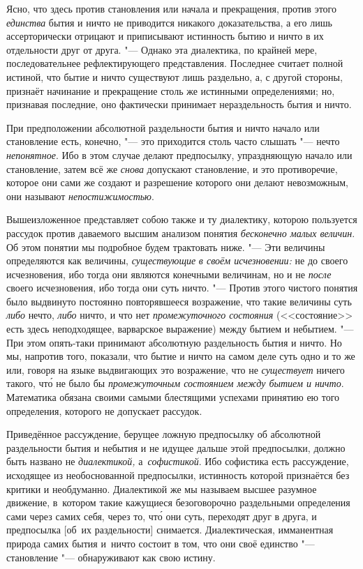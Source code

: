 Ясно, что здесь против становления или начала и прекращения, против этого {\em
единства} бытия и ничто не приводится никакого доказательства, а его лишь
ассерторически отрицают и приписывают истинность бытию и ничто в их отдельности
друг от друга. "--- Однако эта диалектика, по крайней мере, последовательнее
рефлектирующего представления. Последнее считает полной истиной, что бытие и
ничто существуют лишь раздельно, а, с другой стороны, признаёт начинание и
прекращение столь же истинными определениями; но, признавая последние, оно
фактически принимает нераздельность бытия и ничто.

При предположении абсолютной раздельности бытия и ничто начало или становление
есть, конечно, "--- это приходится столь часто слышать "--- нечто
{\em непонятное}. Ибо в этом случае делают предпосылку, упраздняющую начало
или становление, затем всё же {\em снова} допускают становление, и это
противоречие, которое они сами же создают и разрешение которого они делают
невозможным, они называют {\em непостижимостью}.

Вышеизложенное представляет собою также и ту диалектику, которою пользуется
рассудок против даваемого высшим анализом понятия {\em бесконечно малых
величин}. Об этом понятии мы подробное будем трактовать ниже. "--- Эти величины
определяются как величины, {\em существующие} {\em в своём исчезновении:} не до
своего исчезновения, ибо тогда они являются конечными величинам, но и не
{\em после} своего исчезновения, ибо тогда они суть ничто. "--- Против этого
чистого понятия было выдвинуто постоянно повторявшееся возражение, что такие
величины суть {\em либо} нечто, {\em либо} ничто, и что нет {\em промежуточного
состояния} (<<состояние>> есть здесь неподходящее, варварское выражение) между
бытием и небытием. "--- При этом опять-таки принимают абсолютную раздельность
бытия и ничто. Но мы, напротив того, показали, что бытие и ничто на самом деле
суть одно и то же или, говоря на языке выдвигающих это возражение, что не
{\em существует} ничего такого, чт\'{о} не было бы {\em промежуточным
состоянием между бытием и ничто}. Математика обязана своими самыми блестящими
успехами принятию ею того определения, которого не допускает рассудок.

Приведённое рассуждение, берущее ложную предпосылку об абсолютной раздельности
бытия и небытия и не идущее дальше этой предпосылки, должно быть названо не
{\em диалектикой,} а~{\em софистикой}. Ибо софистика есть рассуждение,
исходящее из необоснованной предпосылки, истинность которой признаётся без
критики и необдуманно. Диалектикой же мы называем высшее разумное движение,
в~котором такие кажущиеся безоговорочно раздельными определения сами через
самих себя, через то, чт\'{о} они суть, переходят друг в друга, и предпосылка
[об~их раздельности] снимается. Диалектическая, имманентная природа самих бытия
и~ничто состоит в том, что они своё единство "--- становление "--- обнаруживают
как свою истину.

